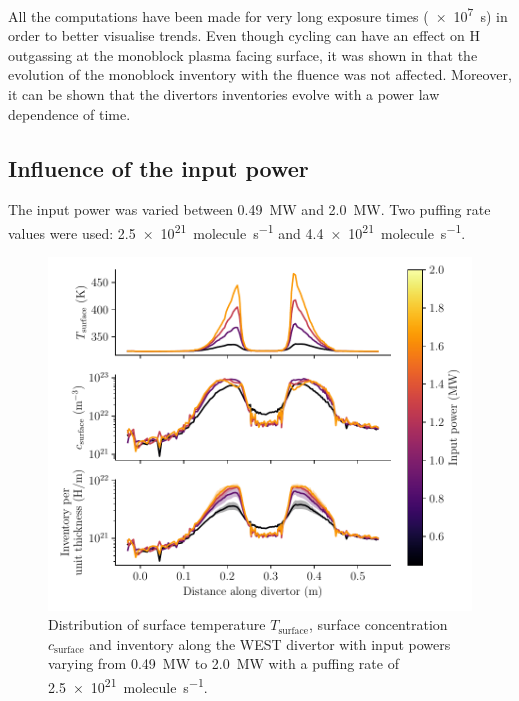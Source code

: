 All the computations have been made for very long exposure times (\SI{e7}{s}) in order to better visualise trends.
Even though cycling can have an effect on H outgassing at the monoblock plasma facing surface, it was shown in  that the evolution of the monoblock inventory with the fluence was not affected.
Moreover, it can be shown that the divertors inventories evolve with a power law dependence of time.

\subsection{Influence of the input power}

The input power was varied between \SI{0.49}{MW} and \SI{2.0}{MW}.
Two puffing rate values were used: \SI{2.5e21}{molecule.s^{-1}} and \SI{4.4e21}{molecule.s^{-1}}.

\begin{figure}[h]
    \centering
    \includegraphics[width=\linewidth]{Figures/divertor/WEST/inventory_along_divertor_input_power.pdf}
    \caption{Distribution of surface temperature $T_\mathrm{surface}$, surface concentration $c_\mathrm{surface}$ and inventory along the WEST divertor with input powers varying from \SI{0.49}{MW} to \SI{2.0}{MW} with a puffing rate of \SI{2.5e21}{molecule.s^{-1}}.}
    \label{fig:divertor distr power scan}
\end{figure}

